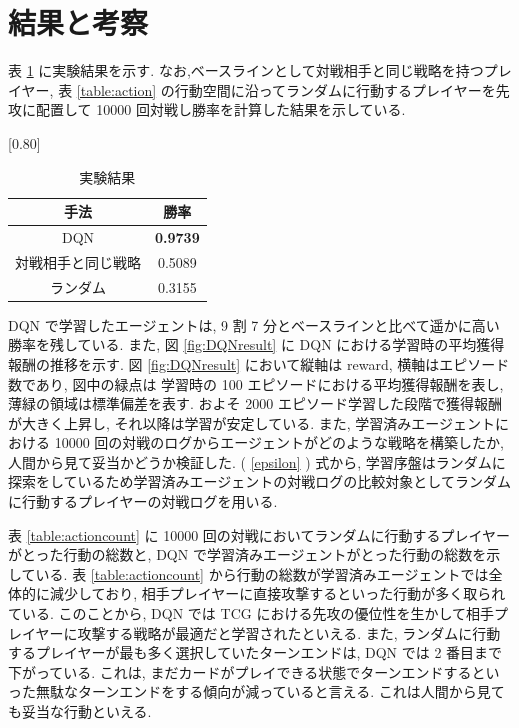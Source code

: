 \documentclass[twocolumn]{jarticle}
\begin{document}
\section{結果と考察}
表 \ref{table:result} に実験結果を示す. なお,ベースラインとして対戦相手と同じ戦略を持つプレイヤー, 表 \ref{table:action} の行動空間に沿ってランダムに行動するプレイヤーを先攻に配置して 10000 回対戦し勝率を計算した結果を示している.\par 
\begin{table}[t]
  \centering
  \caption{実験結果}
  \vspace{-0.3cm}
  \label{table:result}
  \scalebox{0.80}[0.80]{
    \begin{tabular}{|c|c|}
      \hline
      手法 & 勝率 \\ \hline \hline
      DQN & \textbf{0.9739} \\ \hline
      対戦相手と同じ戦略 & 0.5089 \\ \hline     
      ランダム & 0.3155 \\ \hline

      \end{tabular}
  }
  \end{table}
  DQN で学習したエージェントは, 9 割 7 分とベースラインと比べて遥かに高い勝率を残している. また,  図 \ref{fig:DQNresult} に DQN における学習時の平均獲得報酬の推移を示す. 図 \ref{fig:DQNresult}  において縦軸は reward, 横軸はエピソード数であり, 図中の緑点は 学習時の 100 エピソードにおける平均獲得報酬を表し, 薄緑の領域は標準偏差を表す.
  およそ 2000 エピソード学習した段階で獲得報酬が大きく上昇し, それ以降は学習が安定している. 
  また, 学習済みエージェントにおける 10000 回の対戦のログからエージェントがどのような戦略を構築したか, 人間から見て妥当かどうか検証した.  ( \ref{epsilon} ) 式から, 学習序盤はランダムに探索をしているため学習済みエージェントの対戦ログの比較対象としてランダムに行動するプレイヤーの対戦ログを用いる.
  \par
  表 \ref{table:actioncount} に 10000 回の対戦においてランダムに行動するプレイヤーがとった行動の総数と, DQN で学習済みエージェントがとった行動の総数を示している. 
  表 \ref{table:actioncount} から行動の総数が学習済みエージェントでは全体的に減少しており, 相手プレイヤーに直接攻撃するといった行動が多く取られている. このことから, DQN では TCG における先攻の優位性を生かして相手プレイヤーに攻撃する戦略が最適だと学習されたといえる. 
  また, ランダムに行動するプレイヤーが最も多く選択していたターンエンドは, DQN では 2 番目まで下がっている. これは, まだカードがプレイできる状態でターンエンドするといった無駄なターンエンドをする傾向が減っていると言える. これは人間から見ても妥当な行動といえる.\par
\end{document}
